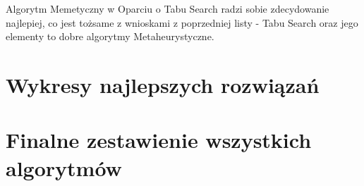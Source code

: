 \documentclass{article}
\begin{document}
Algorytm Memetyczny w Oparciu o Tabu Search radzi sobie zdecydowanie najlepiej, co jest tożsame z wnioskami z poprzedniej listy - Tabu Search
oraz jego elementy to dobre algorytmy Metaheurystyczne.

\section{Wykresy najlepszych rozwiązań}



\section{Finalne zestawienie wszystkich algorytmów}


\end{document}
